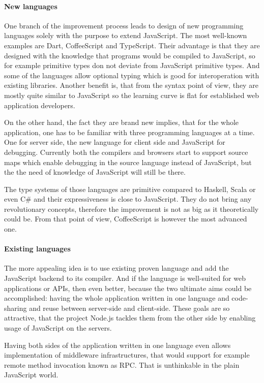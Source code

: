 \documentclass[12pt,a4paper]{report}
\begin{document}
\paragraph{New languages} One branch of the improvement process leads to design of new programming languages solely with the purpose to extend JavaScript. The most well-known examples are Dart\cite{Dart}, CoffeeScript\cite{CoffeeScript} and TypeScript\cite{TypeScript}. Their advantage is that they are designed with the knowledge that programs would be compiled to JavaScript, so for example primitive types don not deviate from JavaScript primitive types. And some of the languages allow optional typing which is good for interoperation with existing libraries. Another benefit is, that from the syntax point of view, they are mostly quite similar to JavaScript so the learning curve is flat for established web application developers. 

On the other hand, the fact they are brand new implies, that for the whole application, one has to be familiar with three programming languages at a time. One for server side, the new language for client side and JavaScript for debugging. Currently both the compilers and browsers start to support source maps which enable debugging in the source language instead of JavaScript, but the the need of knowledge of JavaScript will still be there. 

The type systems of those languages are primitive compared to Haskell, Scala or even C\# and their expressiveness is close to JavaScript. They do not bring any revolutionary concepts, therefore the improvement is not as big as it theoretically could be. From that point of view, CoffeeScript is however the most advanced one.

\paragraph{Existing languages} The more appealing idea is to use existing proven language and add the JavaScript backend to its compiler. And if the language is well-suited for web applications or APIs, then even better, because the two ultimate aims could be accomplished: having the whole application written in one language and code-sharing and reuse between server-side and client-side. These goals are so attractive, that the project Node.js\cite{NodeJs} tackles them from the other side by enabling usage of JavaScript on the servers.

Having both sides of the application written in one language even allows implementation of middleware infrastructures, that would support for example remote method invocation known as RPC\cite{Rpc}. That is unthinkable in the plain JavaScript world.
\end{document}
